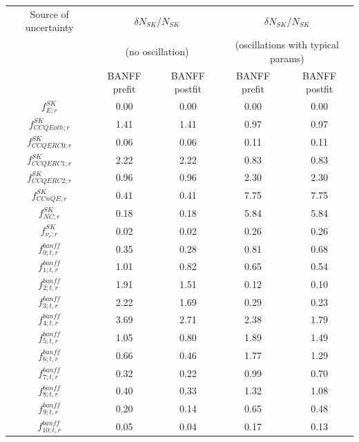 
\begin{table}
\centering
\begin{tabular}{| c || c | c || c | c |}
\hline
  Source of uncertainty        &  \multicolumn {2}{c||}{${\delta}N_{SK}$/$N_{SK}$} & \multicolumn {2}{c||}{${\delta}N_{SK}$/$N_{SK}$} \\
                               &  \multicolumn {2}{c||}{(no oscillation)}          & \multicolumn {2}{c||}{(oscillations with typical params)} \\
                               & BANFF prefit & BANFF postfit & BANFF prefit & BANFF postfit \\
\hline
$f_{E; r}^{SK}$               & 0.00 & 0.00 & 0.00 & 0.00 \\
$f_{CCQEoth; r}^{SK}$         & 1.41 & 1.41 & 0.97 & 0.97 \\
$f_{CCQERC0; r}^{SK}$         & 0.06 & 0.06 & 0.11 & 0.11 \\
$f_{CCQERC1; r}^{SK}$         & 2.22 & 2.22 & 0.83 & 0.83 \\
$f_{CCQERC2; r}^{SK}$         & 0.96 & 0.96 & 2.30 & 2.30 \\
$f_{CCnQE; r}^{SK}$           & 0.41 & 0.41 & 7.75 & 7.75 \\
$f_{NC; r}^{SK}$              & 0.18 & 0.18 & 5.84 & 5.84 \\
$f_{\nu_e; r}^{SK}$           & 0.02 & 0.02 & 0.26 & 0.26 \\
\hline
$f_{0; t, r}^{banff}$         & 0.35 & 0.28 & 0.81 & 0.68 \\
$f_{1; t, r}^{banff}$         & 1.01 & 0.82 & 0.65 & 0.54 \\
$f_{2; t, r}^{banff}$         & 1.91 & 1.51 & 0.12 & 0.10 \\
$f_{3; t, r}^{banff}$         & 2.22 & 1.69 & 0.29 & 0.23 \\
$f_{4; t, r}^{banff}$         & 3.69 & 2.71 & 2.38 & 1.79 \\
$f_{5; t, r}^{banff}$         & 1.05 & 0.80 & 1.89 & 1.49 \\
$f_{6; t, r}^{banff}$         & 0.66 & 0.46 & 1.77 & 1.29 \\
$f_{7; t, r}^{banff}$         & 0.32 & 0.22 & 0.99 & 0.70 \\
$f_{8; t, r}^{banff}$         & 0.40 & 0.33 & 1.32 & 1.08 \\
$f_{9; t, r}^{banff}$         & 0.20 & 0.14 & 0.65 & 0.48 \\
$f_{10; t, r}^{banff}$        & 0.05 & 0.04 & 0.17 & 0.13 \\

\end{tabular}
\end{table}
